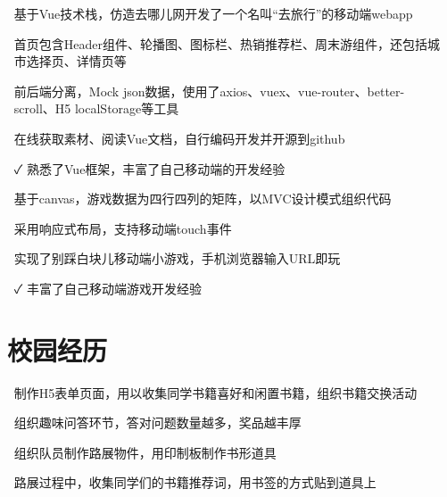 \documentclass[14pt]{resume}
\begin{document}
\begin{onehalfspacing}
\begin{itemize}
    \item[\faFlagO] 基于Vue技术栈，仿造去哪儿网开发了一个名叫“去旅行”的移动端webapp
    \item[\faFlagO] 首页包含Header组件、轮播图、图标栏、热销推荐栏、周末游组件，还包括城市选择页、详情页等
    \item[\faFlagO] 前后端分离，Mock json数据，使用了axios、vuex、vue-router、better-scroll、H5 localStorage等工具
    \item[\faCode] 在线获取素材、阅读Vue文档，自行编码开发并开源到github
    \item[\faCheck] 熟悉了Vue框架，丰富了自己移动端的开发经验
\end{itemize}
\end{onehalfspacing}

\begin{onehalfspacing}
\begin{itemize}
    \item[\faFlagO] 基于canvas，游戏数据为四行四列的矩阵，以MVC设计模式组织代码
    \item[\faFlagO] 采用响应式布局，支持移动端touch事件
    \item[\faCode] 实现了别踩白块儿移动端小游戏，手机浏览器输入URL即玩
    \item[\faCheck] 丰富了自己移动端游戏开发经验
\end{itemize}
\end{onehalfspacing}

\section{\faUniversity\ 校园经历}

\begin{onehalfspacing}
\begin{itemize}
    \item[\faFlagO] 制作H5表单页面，用以收集同学书籍喜好和闲置书籍，组织书籍交换活动
    \item[\faFlagO] 组织趣味问答环节，答对问题数量越多，奖品越丰厚
    \item[\faFlagO] 组织队员制作路展物件，用印制板制作书形道具
    \item[\faFlagO] 路展过程中，收集同学们的书籍推荐词，用书签的方式贴到道具上
\end{itemize}
\end{onehalfspacing}
\end{document}
